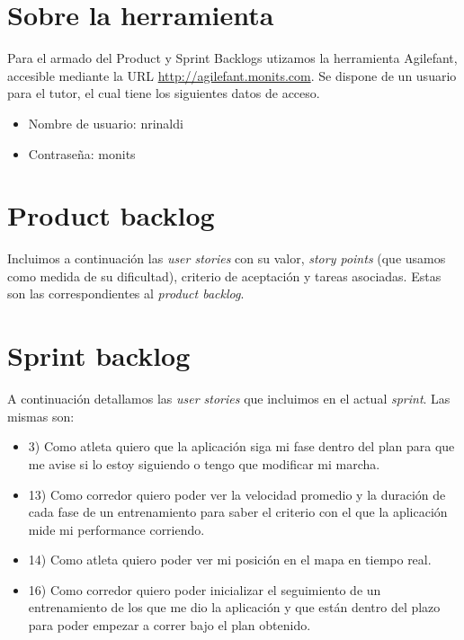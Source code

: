 \documentclass[10pt, a4paper,english,spanish]{article}
\begin{document}

\maketitle
\pagebreak

\tableofcontents
\pagebreak

\section{Sobre la herramienta}

Para el armado del Product y Sprint Backlogs utizamos la herramienta Agilefant,
accesible mediante la URL \url{http://agilefant.monits.com}. Se
dispone de un usuario para el tutor, el cual tiene los siguientes datos de acceso.

\begin{itemize}
	\item Nombre de usuario: nrinaldi
	\item Contrase\~na: monits
\end{itemize}

\section{Product backlog}

Incluimos a continuaci\'on las \textit{user stories} con su valor, \textit{story points} (que usamos
como medida de su dificultad), criterio de aceptaci\'on y tareas asociadas. Estas son las 
correspondientes al \textit{product backlog}.



\section{Sprint backlog}

A continuaci\'on detallamos las \textit{user stories} que incluimos en el actual \textit{sprint}. Las
mismas son:

\begin{itemize}
	\item 3) Como atleta quiero que la aplicación siga mi fase dentro del plan para que me avise si lo estoy siguiendo o tengo que modificar mi marcha.
	\item 13) Como corredor quiero poder ver la velocidad promedio y la duración de cada fase de un entrenamiento para saber el criterio con el que la aplicación mide mi performance corriendo.
	\item 14) Como atleta quiero poder ver mi posición en el mapa en tiempo real.	\item 16) Como corredor quiero poder inicializar el seguimiento de un entrenamiento de los que me dio la aplicación y que están dentro del plazo para poder empezar a correr bajo el plan obtenido.	
\end{itemize}
\end{document}
